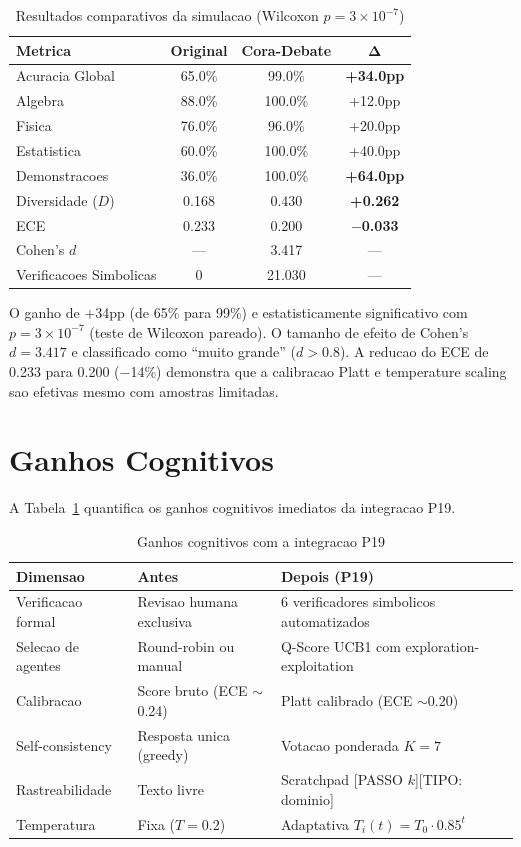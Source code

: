 \documentclass[5p]{elsarticle}
\begin{document}
\begin{table}[H]
\centering
\begin{tabular}{lccc}
\toprule
\textbf{Metrica} & \textbf{Original} & \textbf{Cora-Debate} & $\mathbf{\Delta}$ \\
\midrule
Acuracia Global & 65.0\% & 99.0\% & \textbf{+34.0pp} \\
Algebra & 88.0\% & 100.0\% & +12.0pp \\
Fisica & 76.0\% & 96.0\% & +20.0pp \\
Estatistica & 60.0\% & 100.0\% & +40.0pp \\
Demonstracoes & 36.0\% & 100.0\% & \textbf{+64.0pp} \\
Diversidade ($D$) & 0.168 & 0.430 & \textbf{+0.262} \\
ECE & 0.233 & 0.200 & \textbf{$-$0.033} \\
Cohen's $d$ & --- & 3.417 & --- \\
Verificacoes Simbolicas & 0 & 21.030 & --- \\
\bottomrule
\end{tabular}
\caption{Resultados comparativos da simulacao (Wilcoxon $p = 3\times10^{-7}$)}
\end{table}

O ganho de +34pp (de 65\% para 99\%) e estatisticamente significativo com $p = 3 \times 10^{-7}$ (teste de Wilcoxon pareado). O tamanho de efeito de Cohen's $d = 3.417$ e classificado como ``muito grande'' ($d > 0.8$). A reducao do ECE de 0.233 para 0.200 ($-$14\%) demonstra que a calibracao Platt \cite{platt1999} e temperature scaling \cite{guo2017} sao efetivas mesmo com amostras limitadas.

\section{Ganhos Cognitivos}

A Tabela~\ref{tab:ganhos} quantifica os ganhos cognitivos imediatos da integracao P19.

\begin{table}[H]
\centering
\begin{tabular}{lp{4cm}p{4cm}}
\toprule
\textbf{Dimensao} & \textbf{Antes} & \textbf{Depois (P19)} \\
\midrule
Verificacao formal & Revisao humana exclusiva & 6 verificadores simbolicos automatizados \\
Selecao de agentes & Round-robin ou manual & Q-Score UCB1 com exploration-exploitation \\
Calibracao & Score bruto (ECE $\sim$0.24) & Platt calibrado (ECE $\sim$0.20) \\
Self-consistency & Resposta unica (greedy) & Votacao ponderada $K=7$ \\
Rastreabilidade & Texto livre & Scratchpad [PASSO $k$][TIPO: dominio] \\
Temperatura & Fixa ($T=0.2$) & Adaptativa $T_i(t)=T_0\cdot0.85^t$ \\
\bottomrule
\end{tabular}
\caption{Ganhos cognitivos com a integracao P19}
\label{tab:ganhos}
\end{table}
\end{document}
